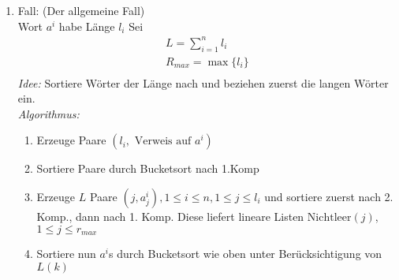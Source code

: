 \begin{enumerate}
            \item Fall: (Der allgemeine Fall) \\
            Wort $a^{i}$ habe Länge $l_{i}$ Sei
            \begin{align*}
                L = \sum \limits_{i=1}^{n} l_{i}\\
                R_{max} = \max \lbrace l_{i} \rbrace\\
            \end{align*}
            \emph{Idee:} Sortiere Wörter der Länge nach und beziehen zuerst die langen Wörter ein. \\
            \emph{Algorithmus:}             
            \begin{enumerate}
                \item Erzeuge Paare $\left( l_{i}, \text{ Verweis auf } a^{i} \right)$\\
                \item Sortiere Paare durch Bucketsort nach 1.Komp\\
                \item Erzeuge $L$ Paare $\left( j, a_{j}^{i} \right), 1 \leq i \leq n, 1 \leq j \leq l_{i}$ 
                    und sortiere zuerst nach 2. Komp., dann nach 1. Komp. Diese liefert lineare Listen $\text{Nichtleer}(j)$, $1 \leq j \leq r_{max}$\\
                \item Sortiere nun $a^{i}$s durch Bucketsort wie oben unter Berücksichtigung von $L(k)$
            \end{enumerate}
        \end{enumerate}

        
        

